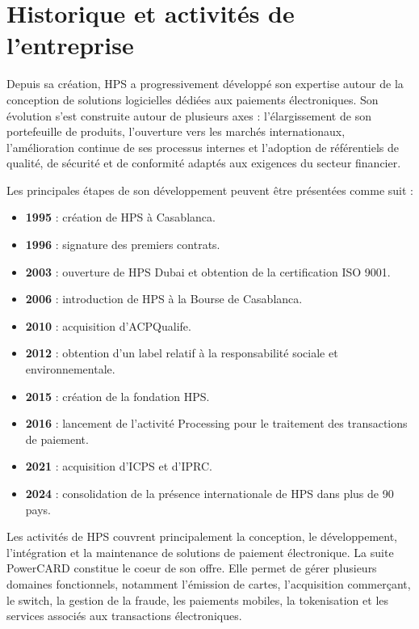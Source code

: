 \documentclass[12pt,a4paper]{report}
\begin{document}
\section{Historique et activités de l'entreprise}

Depuis sa création, HPS a progressivement développé son expertise autour de la conception de solutions logicielles dédiées aux paiements électroniques. Son évolution s'est construite autour de plusieurs axes : l'élargissement de son portefeuille de produits, l'ouverture vers les marchés internationaux, l'amélioration continue de ses processus internes et l'adoption de référentiels de qualité, de sécurité et de conformité adaptés aux exigences du secteur financier.

Les principales étapes de son développement peuvent être présentées comme suit :

\begin{itemize}
    \item \textbf{1995} : création de HPS à Casablanca.
    \item \textbf{1996} : signature des premiers contrats.
    \item \textbf{2003} : ouverture de HPS Dubai et obtention de la certification ISO 9001.
    \item \textbf{2006} : introduction de HPS à la Bourse de Casablanca.
    \item \textbf{2010} : acquisition d'ACPQualife.
    \item \textbf{2012} : obtention d'un label relatif à la responsabilité sociale et environnementale.
    \item \textbf{2015} : création de la fondation HPS.
    \item \textbf{2016} : lancement de l'activité Processing pour le traitement des transactions de paiement.
    \item \textbf{2021} : acquisition d'ICPS et d'IPRC.
    \item \textbf{2024} : consolidation de la présence internationale de HPS dans plus de 90 pays.
\end{itemize}

Les activités de HPS couvrent principalement la conception, le développement, l'intégration et la maintenance de solutions de paiement électronique. La suite PowerCARD constitue le coeur de son offre. Elle permet de gérer plusieurs domaines fonctionnels, notamment l'émission de cartes, l'acquisition commerçant, le switch, la gestion de la fraude, les paiements mobiles, la tokenisation et les services associés aux transactions électroniques.
\end{document}
